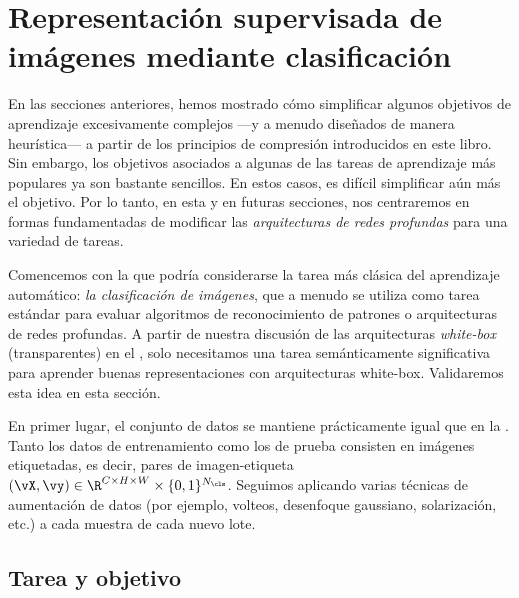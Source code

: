 \documentclass[../../book-main_es.tex]{subfiles}
\begin{document}
\section{Representación supervisada de imágenes mediante clasificación}\label{sec:image_classification}

En las secciones anteriores, hemos mostrado cómo simplificar algunos objetivos de aprendizaje excesivamente
complejos ---y a menudo diseñados de manera heurística--- a partir de 
los principios de compresión introducidos en este libro. Sin embargo,
los objetivos asociados a algunas de las tareas de aprendizaje más populares
ya son bastante sencillos. En estos casos, es difícil
simplificar aún más el objetivo. Por lo tanto, en esta y en futuras secciones, nos
centraremos en formas fundamentadas de modificar las \textit{arquitecturas de redes profundas} 
para una variedad de tareas.

Comencemos con la que podría considerarse la tarea más clásica del aprendizaje automático:
\textit{la clasificación de imágenes}, que a menudo se utiliza como
tarea estándar para evaluar algoritmos de reconocimiento de patrones o arquitecturas de redes profundas.
A partir de nuestra discusión de las arquitecturas \textit{white-box} (transparentes)
en el , solo necesitamos una tarea semánticamente significativa
para aprender buenas representaciones con arquitecturas white-box.
Validaremos esta idea en esta sección.

En primer lugar, el conjunto de datos se mantiene prácticamente igual que en la
. Tanto los datos de entrenamiento como los de prueba
consisten en imágenes etiquetadas, es decir, pares de imagen-etiqueta \((\vX, \vy) \in
\R^{C \times H \times W} \times \{0, 1\}^{N_{\cls}}\). Seguimos aplicando
varias técnicas de aumentación de datos (por ejemplo, volteos, desenfoque gaussiano,
solarización, etc.) a cada muestra de cada nuevo lote.

\subsection{Tarea y objetivo} \label{sub:image_classification_objective}
\end{document}
